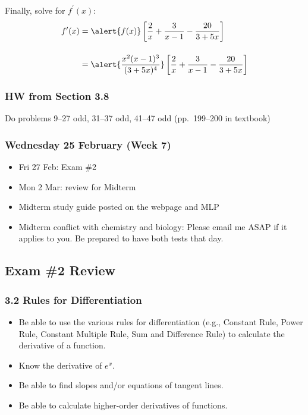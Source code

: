 \documentclass[14pt]{beamer}
\begin{document}
\begin{frame}
\frametitle{}
Finally, solve for $f^{\prime}(x)$:
\begin{alignat*}{2}
f^{\prime}(x) &= \alert{f(x)} \left[ \dfrac{2}{x} + \dfrac{3}{x-1} - \dfrac{20}{3+5x} \right] \\[1pc]
&= \alert{\frac{x^2 (x-1)^3}{(3+5x)^4}} \left[ \dfrac{2}{x} + \dfrac{3}{x-1} - \dfrac{20}{3+5x} \right]
\end{alignat*}
\end{frame}

\begin{frame}
\frametitle{HW from Section 3.8}
Do problems 9--27 odd, 31--37 odd, 41--47 odd (pp.\ 199--200 in textbook)
\end{frame}


\begin{frame}
\frametitle{Wednesday 25 February (Week 7)}
\small
\begin{itemize}
\item Fri 27 Feb: Exam \#2
\item Mon 2 Mar: review for Midterm
\item Midterm study guide posted on the webpage and MLP
\item Midterm conflict with chemistry and biology: Please email me ASAP if it applies to you.  Be prepared to have both tests that day.
\end{itemize}
\end{frame}

\subsection{Exam \#2 Review}

\begin{frame}
\frametitle{3.2 Rules for Differentiation}
\small
\begin{itemize}
\item Be able to use the various rules for differentiation (e.g., Constant Rule, Power Rule, Constant Multiple Rule, Sum and Difference Rule) to calculate the derivative of a function.
\item Know the derivative of $e^x$.
\item Be able to find slopes and/or equations of tangent lines.
\item Be able to calculate higher-order derivatives of functions.
\end{itemize}
\end{frame}
\end{document}
